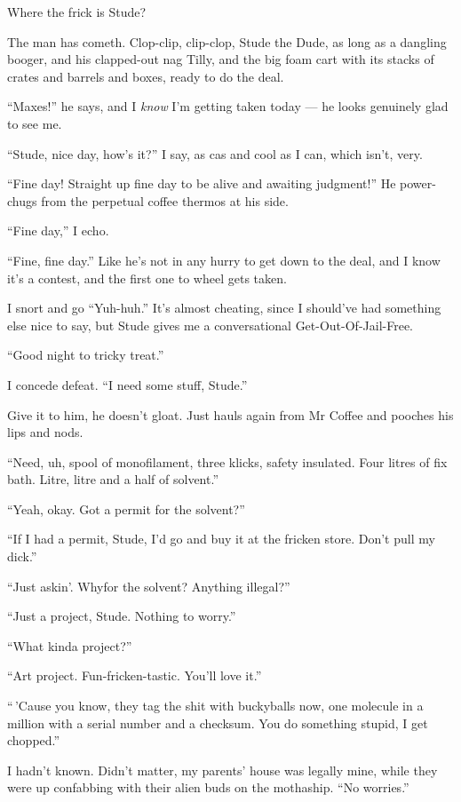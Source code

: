 Where the frick is Stude?

\tb

The man has cometh. Clop-clip, clip-clop, Stude the Dude, as long
as a dangling booger, and his clapped-out nag Tilly, and the big
foam cart with its stacks of crates and barrels and boxes, ready to
do the deal.

``Maxes!'' he says, and I \emph{know} I'm getting taken today ---
he looks genuinely glad to see me.

``Stude, nice day, how's it?'' I say, as cas and cool as I can,
which isn't, very.

``Fine day! Straight up fine day to be alive and awaiting judgment!''
He power-chugs from the perpetual coffee thermos at his side.

``Fine day,'' I echo.

``Fine, fine day.'' Like he's not in any hurry to get down to the
deal, and I know it's a contest, and the first one to wheel gets
taken.

I snort and go ``Yuh-huh.'' It's almost cheating, since I should've
had something else nice to say, but Stude gives me a conversational
Get-Out-Of-Jail-Free.

``Good night to tricky treat.''

I concede defeat. ``I need some stuff, Stude.''

Give it to him, he doesn't gloat. Just hauls again from Mr Coffee
and pooches his lips and nods.

``Need, uh, spool of monofilament, three klicks, safety insulated. Four litres 
of fix bath. Litre, litre and a half of solvent.''

``Yeah, okay. Got a permit for the solvent?''

``If I had a permit, Stude, I'd go and buy it at the fricken store. Don't pull 
my dick.''

``Just askin'. Whyfor the solvent? Anything illegal?''

``Just a project, Stude. Nothing to worry.''

``What kinda project?''

``Art project. Fun-fricken-tastic. You'll love it.''

``\,'Cause you know, they tag the shit with buckyballs now, one molecule in a 
million with a serial number and a checksum. You do something stupid, I get 
chopped.''

I hadn't known. Didn't matter, my parents' house was legally mine,
while they were up confabbing with their alien buds on the
mothaship. ``No worries.''

